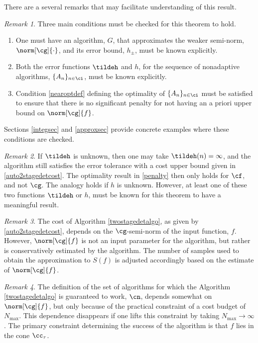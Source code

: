 \documentclass[]{elsarticle}
\theoremstyle{definition}
\theoremstyle{remark}
\newtheorem{rem}{Remark}
\begin{document}
There are a several remarks that may facilitate understanding of this result.

\begin{rem} Three main conditions must be checked for this theorem to hold.
\begin{enumerate}
\renewcommand{\labelenumi}{\roman{enumi}.}
\item One must have an algorithm, $G$, that approximates the weaker semi-norm,  $\norm[\cg]{\cdot}$, and its error bound, $h_{\pm}$, must be known explicitly.
\item Both the error functions $\tildeh$ and $h$, for the sequence of nonadaptive algorithms, $\{A_n\}_{n \in \ci}$, must be known explicitly.  
\item Condition \eqref{nearoptdef} defining the optimality of $\{A_n\}_{n \in \ci}$ must be satisfied to ensure that there is no significant penalty for not having an a priori upper bound on $\norm[\cg]{f}$.
\end{enumerate}
Sections \ref{integsec} and \ref{approxsec} provide concrete examples where these conditions are checked.
\end{rem}

\begin{rem} If $\tildeh$ is unknown, then one may take $\tildeh(n)=\infty$, and the algorithm still satisfies the error tolerance with a cost upper bound given in \eqref{auto2stagedetcost}.  The optimality result in \eqref{penalty} then only holds for $\cf$, and not $\cg$.  The analogy holds if $h$ is unknown.  However, at least one of these two functions $\tildeh$ or $h$, must be known for this theorem to have a meaningful result.
\end{rem}

\begin{rem} The cost of Algorithm \ref{twostagedetalgo}, as given by \eqref{auto2stagedetcost}, depends on the $\cg$-semi-norm of the input function, $f$.  However, $\norm[\cg]{f}$ is not an input parameter for the algorithm, but rather is  conservatively estimated by the algorithm.  The number of samples used to obtain the approximation to $S(f)$ is adjusted accordingly based on the estimate of $\norm[\cg]{f}$.
\end{rem}

\begin{rem}
The definition of the set of algorithms for which the Algorithm \ref{twostagedetalgo} is guaranteed to work, $\cn$, depends somewhat on $\norm[\cg]{f}$, but only because of the practical constraint of a cost budget of $N_{\max}$.  This dependence disappears if one lifts this constraint by taking $N_{\max} \to \infty$.  The primary constraint determining the success of the algorithm is that $f$ lies in the cone $\cc_{\tau}$.
\end{rem}
\end{document}
